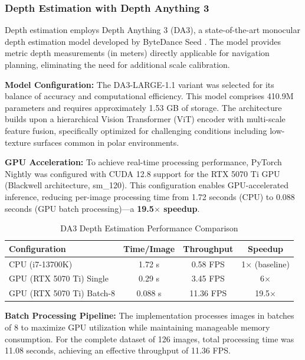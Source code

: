 \subsubsection{Depth Estimation with Depth Anything 3}

Depth estimation employs Depth Anything 3 (DA3), a state-of-the-art monocular depth estimation model developed by ByteDance Seed \parencite{depthanything32025}. The model provides metric depth measurements (in meters) directly applicable for navigation planning, eliminating the need for additional scale calibration.

\textbf{Model Configuration:} The DA3-LARGE-1.1 variant was selected for its balance of accuracy and computational efficiency. This model comprises 410.9M parameters and requires approximately 1.53 GB of storage. The architecture builds upon a hierarchical Vision Transformer (ViT) encoder with multi-scale feature fusion, specifically optimized for challenging conditions including low-texture surfaces common in polar environments.

\textbf{GPU Acceleration:} To achieve real-time processing performance, PyTorch Nightly was configured with CUDA 12.8 support for the RTX 5070 Ti GPU (Blackwell architecture, sm\_120). This configuration enables GPU-accelerated inference, reducing per-image processing time from 1.72 seconds (CPU) to 0.088 seconds (GPU batch processing)---a \textbf{19.5$\times$ speedup}.

\begin{table}[htbp]
\centering
\caption{DA3 Depth Estimation Performance Comparison}
\label{tab:da3_performance}
\begin{tabular}{@{}lccc@{}}
\toprule
\textbf{Configuration} & \textbf{Time/Image} & \textbf{Throughput} & \textbf{Speedup} \\
\midrule
CPU (i7-13700K) & 1.72 s & 0.58 FPS & 1$\times$ (baseline) \\
GPU (RTX 5070 Ti) Single & 0.29 s & 3.45 FPS & 6$\times$ \\
GPU (RTX 5070 Ti) Batch-8 & 0.088 s & 11.36 FPS & 19.5$\times$ \\
\bottomrule
\end{tabular}
\end{table}

\textbf{Batch Processing Pipeline:} The implementation processes images in batches of 8 to maximize GPU utilization while maintaining manageable memory consumption. For the complete dataset of 126 images, total processing time was 11.08 seconds, achieving an effective throughput of 11.36 FPS.

